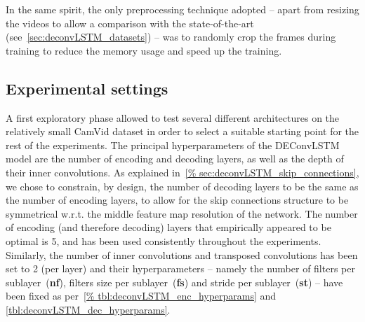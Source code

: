 In the same spirit, the only preprocessing technique adopted -- apart from
resizing the videos to allow a comparison with the state-of-the-art
(see~\autoref{sec:deconvLSTM_datasets}) -- was to randomly crop the frames
during training to reduce the memory usage and speed up the training.

\subsection{Experimental settings}\label{sec:deconvLSTM_settings}

A first exploratory phase allowed to test several different architectures on
the relatively small CamVid dataset in order to select a suitable starting
point for the rest of the experiments. The principal hyperparameters of the
DEConvLSTM model are the number of encoding and decoding layers, as well as the
depth of their inner convolutions. As explained in~\autoref{%
sec:deconvLSTM_skip_connections}, we chose to constrain, by design, the number
of decoding layers to be the same as the number of encoding layers, to allow
for the skip connections structure to be symmetrical w.r.t. the middle feature
map resolution of the network. The number of encoding (and therefore decoding)
layers that empirically appeared to be optimal is 5, and has been used
consistently throughout the experiments.  Similarly, the number of inner
convolutions and transposed convolutions has been set to 2 (per layer) and
their hyperparameters -- namely the number of filters per
sublayer~(\textbf{nf}), filters size per sublayer~(\textbf{fs}) and stride per
sublayer~(\textbf{st}) -- have been fixed as per~\autoref{%
tbl:deconvLSTM_enc_hyperparams} and \autoref{tbl:deconvLSTM_dec_hyperparams}.

